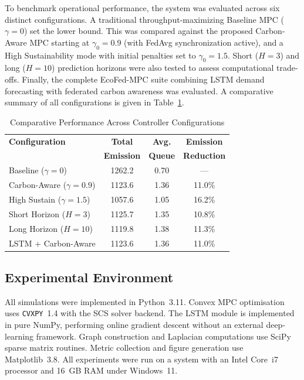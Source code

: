 \documentclass[journal]{IEEEtran}
\begin{document}
To benchmark operational performance, the system was evaluated across six distinct configurations. A traditional throughput-maximizing Baseline MPC ($\gamma = 0$) set the lower bound. This was compared against the proposed Carbon-Aware MPC starting at $\gamma_0 = 0.9$ (with FedAvg synchronization active), and a High Sustainability mode with initial penalties set to $\gamma_0 = 1.5$. Short ($H = 3$) and long ($H = 10$) prediction horizons were also tested to assess computational trade-offs. Finally, the complete EcoFed-MPC suite combining LSTM demand forecasting with federated carbon awareness was evaluated. A comparative summary of all configurations is given in Table~\ref{tab_results}.

\begin{table}[!t]
\renewcommand{\arraystretch}{1.3}
\caption{Comparative Performance Across Controller Configurations}
\label{tab_results}
\centering
\begin{tabular}{|l|c|c|c|}
\hline
\textbf{Configuration}       & \textbf{Total}    & \textbf{Avg.}     & \textbf{Emission} \\
                             & \textbf{Emission} & \textbf{Queue}    & \textbf{Reduction} \\ \hline
Baseline ($\gamma\!=\!0$)    & 1262.2            & 0.70              & ---                \\ \hline
Carbon-Aware ($\gamma\!=\!0.9$) & 1123.6         & 1.36              & 11.0\%             \\ \hline
High Sustain ($\gamma\!=\!1.5$) & 1057.6         & 1.05              & 16.2\%             \\ \hline
Short Horizon ($H\!=\!3$)    & 1125.7            & 1.35              & 10.8\%             \\ \hline
Long Horizon ($H\!=\!10$)    & 1119.8            & 1.38              & 11.3\%             \\ \hline
LSTM + Carbon-Aware          & 1123.6            & 1.36              & 11.0\%             \\ \hline
\end{tabular}
\end{table}

\subsection{Experimental Environment}
All simulations were implemented in Python~3.11.  Convex MPC optimisation
uses \texttt{CVXPY}~1.4 with the SCS solver backend.  The LSTM module is
implemented in pure NumPy, performing online gradient descent without an
external deep-learning framework.  Graph construction and Laplacian
computations use SciPy sparse matrix routines.  Metric collection and
figure generation use Matplotlib~3.8.  All experiments were run on a
system with an Intel Core~i7 processor and 16~GB RAM under Windows~11.
\end{document}
